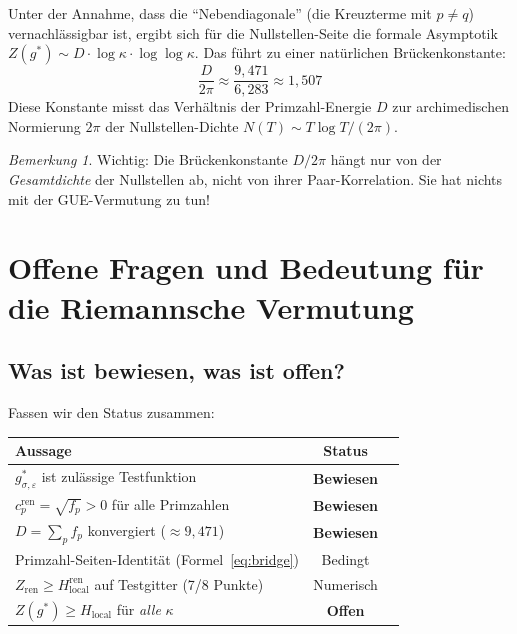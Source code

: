 \documentclass[11pt,a4paper]{article}
\theoremstyle{plain}
\theoremstyle{definition}
\theoremstyle{remark}
\newtheorem{remark}[theorem]{Bemerkung}
\newcommand{\Hlocal}{H_{\mathrm{local}}}
\newcommand{\cren}{c_p^{\mathrm{ren}}}
\newcommand{\Zren}{Z_{\mathrm{ren}}}
\newcommand{\Hren}{H_{\mathrm{local}}^{\mathrm{ren}}}
\begin{document}
	Unter der Annahme, dass die ``Nebendiagonale'' (die Kreuzterme mit
	$p \neq q$) vernachl\"assigbar ist, ergibt sich f\"ur die
	Nullstellen-Seite die formale Asymptotik
	$Z(g^*) \sim D \cdot \log\kappa \cdot \log\log\kappa$.
	Das f\"uhrt zu einer nat\"urlichen Br\"uckenkonstante:
	\[
	\frac{D}{2\pi} \approx \frac{9{,}471}{6{,}283} \approx 1{,}507
	\]
	Diese Konstante misst das Verh\"altnis der Primzahl-Energie $D$
	zur archimedischen Normierung $2\pi$ der Nullstellen-Dichte
	$N(T) \sim T \log T / (2\pi)$.
	
	\begin{remark}
		Wichtig: Die Br\"uckenkonstante $D/2\pi$ h\"angt nur von der
		\emph{Gesamtdichte} der Nullstellen ab, nicht von ihrer
		Paar-Korrelation. Sie hat nichts mit der GUE-Vermutung zu tun!
	\end{remark}
	
	
	
	\section{Offene Fragen und Bedeutung f\"ur die Riemannsche Vermutung}\label{sec:offen}
	
	\subsection{Was ist bewiesen, was ist offen?}
	
	Fassen wir den Status zusammen:
	
	\begin{center}
		\begin{tabular}{p{7cm}cc}
			\toprule
			\textbf{Aussage} & \textbf{Status} \\
			\midrule
			$g^*_{\sigma,\varepsilon}$ ist zul\"assige Testfunktion & \textbf{Bewiesen} \\
			$\cren = \sqrt{f_p} > 0$ f\"ur alle Primzahlen & \textbf{Bewiesen} \\
			$D = \sum_p f_p$ konvergiert ($\approx 9{,}471$) & \textbf{Bewiesen} \\
			Primzahl-Seiten-Identit\"at (Formel~\ref{eq:bridge}) & Bedingt \\
			$\Zren \geq \Hren$ auf Testgitter (7/8 Punkte) & Numerisch \\
			$Z(g^*) \geq \Hlocal$ f\"ur \emph{alle} $\kappa$ & \textbf{Offen} \\
			\bottomrule
		\end{tabular}
	\end{center}
	
\end{document}
